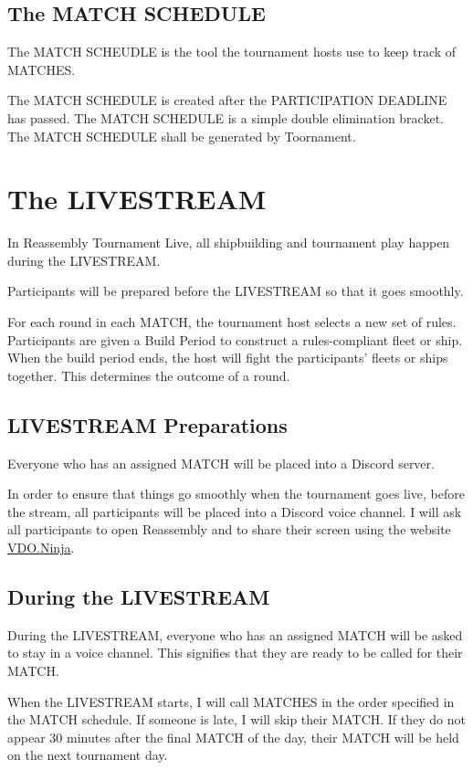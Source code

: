 \documentclass[11pt]{article}
\newcommand{\RTL}{Reassembly Tournament Live}
\newcommand{\termemph}[1]{\uppercase{#1}}
\begin{document}
\subsection{The \termemph{Match Schedule}}
The \termemph{Match Scheudle} is the tool the tournament hosts use to keep track of
\termemph{Matches}.

The \termemph{Match Schedule} is created after the \termemph{Participation Deadline} has passed.
The \termemph{Match Schedule} is a simple double elimination bracket. The \termemph{Match Schedule}
shall be generated by Toornament. %

\section{The \termemph{Livestream}}
In \RTL{}, all shipbuilding and tournament play happen during the \termemph{Livestream}.

Participants will be prepared before the \termemph{Livestream} so that it goes smoothly.

For each round in each \termemph{match}, the tournament host selects a new set of rules. Participants are
given a Build Period to construct a rules-compliant fleet or ship. When the build period ends,
the host will fight the participants' fleets or ships together. This determines the outcome of
a round.

\subsection{\termemph{Livestream} Preparations}
Everyone who has an assigned \termemph{match} will be placed into a Discord server. 

In order to ensure that things go smoothly when the tournament goes live, before the stream, 
all participants will be placed into a Discord voice channel. I will ask all participants to open 
Reassembly and to share their screen using the website \href{https://vdo.ninja/}{VDO.Ninja}.

\subsection{During the \termemph{Livestream}}
During the \termemph{Livestream}, everyone who has an assigned \termemph{match} will be asked to stay in a voice
channel. This signifies that they are ready to be called for their \termemph{match}. 

When the \termemph{Livestream} starts, I will call \termemph{matches} in the order specified in the \termemph{match} schedule.
If someone is late, I will skip their \termemph{match}. If they do not appear
30 minutes after the final \termemph{match} of the day, their \termemph{match} will be held on the next tournament day.
\end{document}

